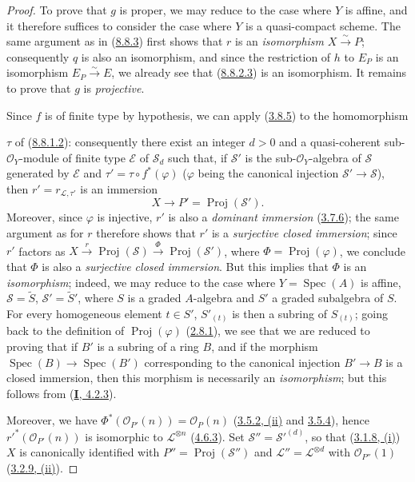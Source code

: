 \begin{proof}
To prove that $g$ is proper, we may reduce to the case where $Y$ is affine,
and it therefore suffices to consider the case where $Y$ is a quasi-compact
scheme. The same argument as in (\hyperref[II.8.8.3]{8.8.3}) first shows
that $r$ is an \emph{isomorphism} $X\xrightarrow{\sim}P$; consequently $q$ is
also an isomorphism, and since the restriction of $h$ to $E_P$ is an
isomorphism $E_P\xrightarrow{\sim}E$, we already see that
(\hyperref[II.8.8.2.3]{8.8.2.3}) is an isomorphism. It remains to prove
that $g$ is \emph{projective}.

Since $f$ is of finite type by hypothesis, we can apply
(\hyperref[II.3.8.5]{3.8.5}) to the homomorphism

$\tau$ of (\hyperref[II.8.8.1.2]{8.8.1.2}): consequently there exist an
integer $d>0$ and a quasi-coherent sub-$\mathcal{O}_Y$-module of finite type
$\mathcal{E}$ of $\mathcal{S}_d$ such that, if $\mathcal{S}'$ is the
sub-$\mathcal{O}_Y$-algebra of $\mathcal{S}$ generated by $\mathcal{E}$ and
$\tau'=\tau\circ f^*(\varphi)$ ($\varphi$ being the canonical injection
$\mathcal{S}'\to\mathcal{S}$), then $r'=r_{\mathcal{L},\tau'}$ is an immersion
\[
  X\longrightarrow P'=\operatorname{Proj}(\mathcal{S}').
\]
Moreover, since $\varphi$ is injective, $r'$ is also a \emph{dominant
immersion} (\hyperref[II.3.7.6]{3.7.6}); the same argument as for $r$
therefore shows that $r'$ is a \emph{surjective closed immersion}; since $r'$
factors as
$X\xrightarrow{r}\operatorname{Proj}(\mathcal{S})
\xrightarrow{\Phi}\operatorname{Proj}(\mathcal{S}')$, where
$\Phi=\operatorname{Proj}(\varphi)$, we conclude that $\Phi$ is also a
\emph{surjective closed immersion}. But this implies that $\Phi$ is an
\emph{isomorphism}; indeed, we may reduce to the case where
$Y=\operatorname{Spec}(A)$ is affine, $\mathcal{S}=\widetilde{S}$,
$\mathcal{S}'=\widetilde{S}'$, where $S$ is a graded $A$-algebra and $S'$ a
graded subalgebra of $S$. For every homogeneous element $t\in S'$,
$S'_{(t)}$ is then a subring of $S_{(t)}$; going back to the
definition of $\operatorname{Proj}(\varphi)$
(\hyperref[II.2.8.1]{2.8.1}), we see that we are reduced to proving that if
$B'$ is a subring of a ring $B$, and if the morphism
$\operatorname{Spec}(B)\to\operatorname{Spec}(B')$ corresponding to the
canonical injection $B'\to B$ is a closed immersion, then this morphism is
necessarily an \emph{isomorphism}; but this follows from
(\hyperref[I.4.2.3]{\textbf{I}, 4.2.3}).

Moreover, we have
$\Phi^*(\mathcal{O}_{P'}(n))=\mathcal{O}_P(n)$
(\hyperref[II.3.5.2]{3.5.2, (ii)} and
\hyperref[II.3.5.4]{3.5.4}), hence
$r'^*(\mathcal{O}_{P'}(n))$ is isomorphic to $\mathcal{L}^{\otimes n}$
(\hyperref[II.4.6.3]{4.6.3}). Set
$\mathcal{S}''=\mathcal{S}'^{(d)}$, so that
(\hyperref[II.3.1.8]{3.1.8, (i)}) $X$ is canonically identified with
$P''=\operatorname{Proj}(\mathcal{S}'')$ and
$\mathcal{L}''=\mathcal{L}^{\otimes d}$ with $\mathcal{O}_{P''}(1)$
(\hyperref[II.3.2.9]{3.2.9, (ii)}).


\end{proof}
